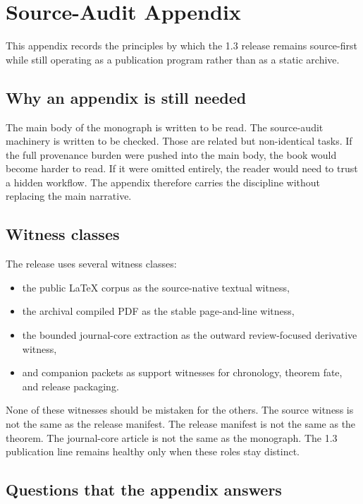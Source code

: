 \section{Source-Audit Appendix}
\label{sec:oc13-source-audit-appendix}

This appendix records the principles by which the 1.3 release remains source-first while still
operating as a publication program rather than as a static archive.

\subsection{Why an appendix is still needed}

The main body of the monograph is written to be read.
The source-audit machinery is written to be checked.
Those are related but non-identical tasks.
If the full provenance burden were pushed into the main body, the book would become harder to read.
If it were omitted entirely, the reader would need to trust a hidden workflow.
The appendix therefore carries the discipline without replacing the main narrative.

\subsection{Witness classes}

The release uses several witness classes:

\begin{itemize}
\item the public LaTeX corpus as the source-native textual witness,
\item the archival compiled PDF as the stable page-and-line witness,
\item the bounded journal-core extraction as the outward review-focused derivative witness,
\item and companion packets as support witnesses for chronology, theorem fate, and release
      packaging.
\end{itemize}

None of these witnesses should be mistaken for the others.
The source witness is not the same as the release manifest.
The release manifest is not the same as the theorem.
The journal-core article is not the same as the monograph.
The 1.3 publication line remains healthy only when these roles stay distinct.

\subsection{Questions that the appendix answers}

